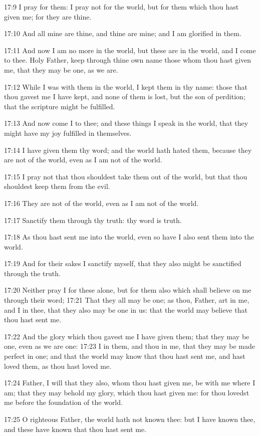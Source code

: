 17:9 I pray for them: I pray not for the world, but for them which thou hast given me; for they are thine.

17:10 And all mine are thine, and thine are mine; and I am glorified in them.

17:11 And now I am no more in the world, but these are in the world, and I come to thee. Holy Father, keep through thine own name those whom thou hast given me, that they may be one, as we are.

17:12 While I was with them in the world, I kept them in thy name: those that thou gavest me I have kept, and none of them is lost, but the son of perdition; that the scripture might be fulfilled.

17:13 And now come I to thee; and these things I speak in the world, that they might have my joy fulfilled in themselves.

17:14 I have given them thy word; and the world hath hated them, because they are not of the world, even as I am not of the world.

17:15 I pray not that thou shouldest take them out of the world, but that thou shouldest keep them from the evil.

17:16 They are not of the world, even as I am not of the world.

17:17 Sanctify them through thy truth: thy word is truth.

17:18 As thou hast sent me into the world, even so have I also sent them into the world.

17:19 And for their sakes I sanctify myself, that they also might be sanctified through the truth.

17:20 Neither pray I for these alone, but for them also which shall believe on me through their word; 17:21 That they all may be one; as thou, Father, art in me, and I in thee, that they also may be one in us: that the world may believe that thou hast sent me.

17:22 And the glory which thou gavest me I have given them; that they may be one, even as we are one: 17:23 I in them, and thou in me, that they may be made perfect in one; and that the world may know that thou hast sent me, and hast loved them, as thou hast loved me.

17:24 Father, I will that they also, whom thou hast given me, be with me where I am; that they may behold my glory, which thou hast given me: for thou lovedst me before the foundation of the world.

17:25 O righteous Father, the world hath not known thee: but I have known thee, and these have known that thou hast sent me.

